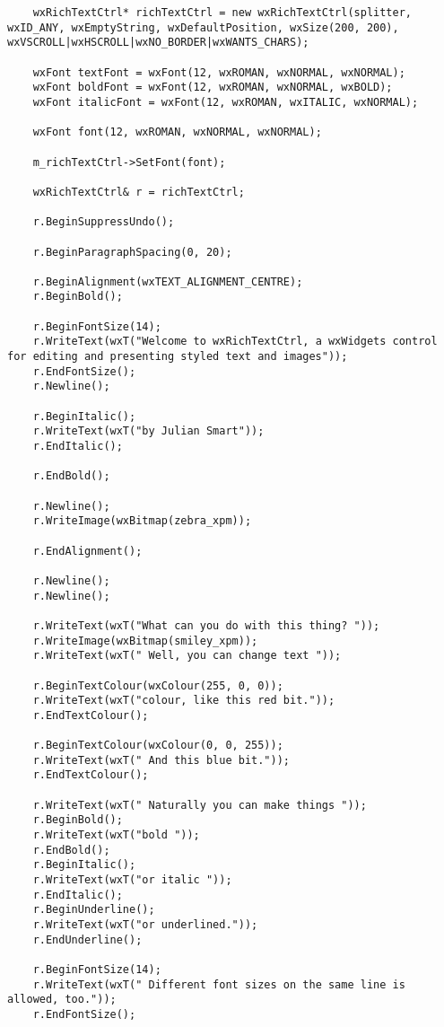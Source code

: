 {\small
\begin{verbatim}
    wxRichTextCtrl* richTextCtrl = new wxRichTextCtrl(splitter, wxID_ANY, wxEmptyString, wxDefaultPosition, wxSize(200, 200), wxVSCROLL|wxHSCROLL|wxNO_BORDER|wxWANTS_CHARS);

    wxFont textFont = wxFont(12, wxROMAN, wxNORMAL, wxNORMAL);
    wxFont boldFont = wxFont(12, wxROMAN, wxNORMAL, wxBOLD);
    wxFont italicFont = wxFont(12, wxROMAN, wxITALIC, wxNORMAL);

    wxFont font(12, wxROMAN, wxNORMAL, wxNORMAL);

    m_richTextCtrl->SetFont(font);

    wxRichTextCtrl& r = richTextCtrl;

    r.BeginSuppressUndo();

    r.BeginParagraphSpacing(0, 20);

    r.BeginAlignment(wxTEXT_ALIGNMENT_CENTRE);
    r.BeginBold();

    r.BeginFontSize(14);
    r.WriteText(wxT("Welcome to wxRichTextCtrl, a wxWidgets control for editing and presenting styled text and images"));
    r.EndFontSize();
    r.Newline();

    r.BeginItalic();
    r.WriteText(wxT("by Julian Smart"));
    r.EndItalic();

    r.EndBold();

    r.Newline();
    r.WriteImage(wxBitmap(zebra_xpm));

    r.EndAlignment();

    r.Newline();
    r.Newline();

    r.WriteText(wxT("What can you do with this thing? "));
    r.WriteImage(wxBitmap(smiley_xpm));
    r.WriteText(wxT(" Well, you can change text "));

    r.BeginTextColour(wxColour(255, 0, 0));
    r.WriteText(wxT("colour, like this red bit."));
    r.EndTextColour();

    r.BeginTextColour(wxColour(0, 0, 255));
    r.WriteText(wxT(" And this blue bit."));
    r.EndTextColour();

    r.WriteText(wxT(" Naturally you can make things "));
    r.BeginBold();
    r.WriteText(wxT("bold "));
    r.EndBold();
    r.BeginItalic();
    r.WriteText(wxT("or italic "));
    r.EndItalic();
    r.BeginUnderline();
    r.WriteText(wxT("or underlined."));
    r.EndUnderline();

    r.BeginFontSize(14);
    r.WriteText(wxT(" Different font sizes on the same line is allowed, too."));
    r.EndFontSize();


\end{verbatim}}
